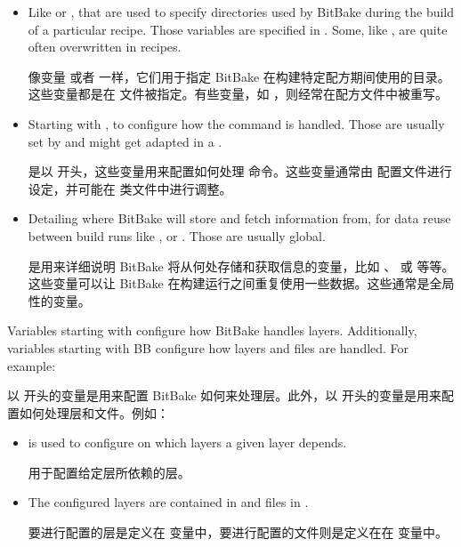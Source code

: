 \begin{itemize}
\setlength\itemsep{1.0em}
    
\item Like  or , that are used to specify directories used by BitBake during the build of a particular recipe. Those variables are specified in . Some, like , are quite often overwritten in recipes.

\medskip
像变量  或者  一样，它们用于指定 BitBake 在构建特定配方期间使用的目录。这些变量都是在  文件被指定。有些变量，如 ，则经常在配方文件中被重写。

\item Starting with , to configure how the  command is handled. Those are usually set by  and might get adapted in a .

\medskip
是以  开头，这些变量用来配置如何处理  命令。这些变量通常由  配置文件进行设定，并可能在  类文件中进行调整。

\item Detailing where BitBake will store and fetch information from, for data reuse between build runs like ,  or . Those are usually global.

\medskip
是用来详细说明 BitBake 将从何处存储和获取信息的变量，比如 、 或  等等。这些变量可以让 BitBake 在构建运行之间重复使用一些数据。这些通常是全局性的变量。
\end{itemize}


Variables starting with  configure how BitBake handles layers. Additionally, variables starting with BB configure how layers and files are handled. For example:

以  开头的变量是用来配置 BitBake 如何来处理层。此外，以  开头的变量是用来配置如何处理层和文件。例如：

\begin{itemize}
\setlength\itemsep{1.0em}
   
\item {} is used to configure on which layers a given layer depends.

\medskip
{} 用于配置给定层所依赖的层。

\item The configured layers are contained in  and files in .

\medskip
要进行配置的层是定义在  变量中，要进行配置的文件则是定义在在  变量中。
\end{itemize}


